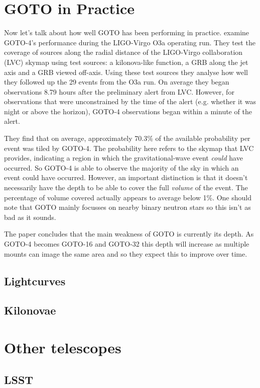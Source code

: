 \documentclass[twocolumn]{aastex631}
\newcommand{\placeholder}[1]{{\color{gray} \lipsum[#1]}}
\begin{document}
\section{GOTO in Practice}
Now let's talk about how well GOTO has been performing in practice. \citet{Gompertz+2020} examine GOTO-4's performance during the LIGO-Virgo O3a operating run. They test the coverage of sources along the radial distance of the LIGO-Virgo collaboration (LVC) skymap using test sources: a kilonova-like function, a GRB along the jet axis and a GRB viewed off-axis. Using these test sources they analyse how well they followed up the 29 events from the O3a run. On average they began observations 8.79 hours after the preliminary alert from LVC. However, for observations that were unconstrained by the time of the alert (e.g. whether it was night or above the horizon), GOTO-4 observations began within a minute of the alert.

They find that on average, approximately 70.3\% of the available probability per event was tiled by GOTO-4. The probability here refers to the skymap that LVC provides, indicating a region in which the gravitational-wave event \textit{could} have occurred. So GOTO-4 is able to observe the majority of the sky in which an event could have occurred. However, an important distinction is that it doesn't necessarily have the depth to be able to cover the full \textit{volume} of the event. The percentage of volume covered actually appears to average below 1\%. One should note that GOTO mainly focusses on nearby binary neutron stars so this isn't as bad as it sounds.

The paper concludes that the main weakness of GOTO is currently its depth. As GOTO-4 becomes GOTO-16 and GOTO-32 this depth will increase as multiple mounts can image the same area and so they expect this to improve over time.

\subsection{Lightcurves}
\citet{Burhanudin+2021}
\placeholder{6}

\subsection{Kilonovae}
\citet{Chase+2022}
\placeholder{7}

\section{Other telescopes}
\subsection{LSST}
\citet{Andreoni+2022}
\placeholder{8}


{}
\end{document}
